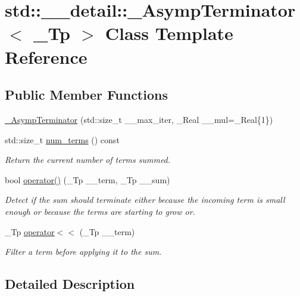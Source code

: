 \hypertarget{classstd_1_1____detail_1_1__AsympTerminator}{}\section{std\+:\+:\+\_\+\+\_\+detail\+:\+:\+\_\+\+Asymp\+Terminator$<$ \+\_\+\+Tp $>$ Class Template Reference}
\label{classstd_1_1____detail_1_1__AsympTerminator}
\subsection*{Public Member Functions}
\begin{DoxyCompactItemize}
\item 
\hyperlink{classstd_1_1____detail_1_1__AsympTerminator_a2a052a2ebedaa33cae3a6c07d73ca9cf}{\+\_\+\+Asymp\+Terminator} (std\+::size\+\_\+t \+\_\+\+\_\+max\+\_\+iter, \+\_\+\+Real \+\_\+\+\_\+mul=\+\_\+\+Real\{1\})
\item 
std\+::size\+\_\+t \hyperlink{classstd_1_1____detail_1_1__AsympTerminator_a463f9e4e87d22b9839c12cc28b085117}{num\+\_\+terms} () const
\begin{DoxyCompactList}\small\item\em Return the current number of terms summed. \end{DoxyCompactList}\item 
bool \hyperlink{classstd_1_1____detail_1_1__AsympTerminator_ad57254b6dcdd419b785477711b296729}{operator()} (\+\_\+\+Tp \+\_\+\+\_\+term, \+\_\+\+Tp \+\_\+\+\_\+sum)
\begin{DoxyCompactList}\small\item\em Detect if the sum should terminate either because the incoming term is small enough or because the terms are starting to grow or. \end{DoxyCompactList}\item 
\+\_\+\+Tp \hyperlink{classstd_1_1____detail_1_1__AsympTerminator_a7299b3abc814127eba98d16f6ac7d4e1}{operator$<$$<$} (\+\_\+\+Tp \+\_\+\+\_\+term)
\begin{DoxyCompactList}\small\item\em Filter a term before applying it to the sum. \end{DoxyCompactList}\end{DoxyCompactItemize}


\subsection{Detailed Description}
